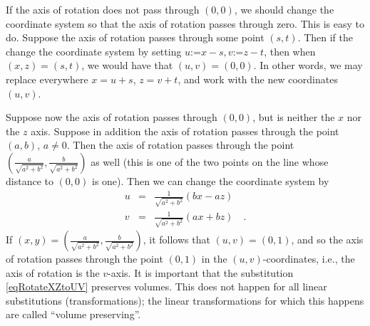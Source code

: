 \documentclass[12pt]{book}
\newcommand{\eqdef}{\textbf{:=}}
\begin{document}
If the axis of rotation does not pass through $(0,0)$, we should change the coordinate system so that the axis of rotation passes through zero. This is easy to do. Suppose the axis of rotation passes through some point $(s,t)$. Then if the change the coordinate system by setting $u\eqdef x-s, v\eqdef z-t$, then when $(x,z)=(s,t)$, we would have that $(u,v)=(0,0)$. In other words, we may replace everywhere $x=u+s$, $z=v+t$, and work with the new coordinates $(u,v)$.

Suppose now the axis of rotation passes through $(0,0)$, but is neither the $x$ nor the $z$ axis. Suppose in addition the axis of rotation passes through the point $(a,b)$, $a\neq 0$. Then the axis of rotation passes through the point $(\frac{a}{\sqrt{a^2+b^2}},\frac{b}{\sqrt{a^2+b^2}})$ as well (this is one of the two points on the line whose distance to $(0,0)$ is one). Then we can change the coordinate system by
\begin{equation}\label{eqRotateXZtoUV}
\begin{array}{rcl}
u &=&\frac{1}{\sqrt{a^2+b^2}}\left( bx-az\right)\\
v &=& \frac{1}{\sqrt{a^2+b^2}}\left( ax+bz\right)\quad .
\end{array}
\end{equation}
If $(x,y)= (\frac{a}{\sqrt{a^2+b^2}}, \frac{b}{ \sqrt{a^2 +b^2}})$, it follows that $(u,v)=(0,1)$, and so the axis of rotation passes through the point $(0,1)$ in the $(u,v)$-coordinates, i.e., the axis of rotation is the $v$-axis. It is important that the substitution \eqref{eqRotateXZtoUV} preserves volumes. This does not happen for all linear substitutions (transformations); the linear transformations for which this happens are called ``volume preserving''.
\end{document}
